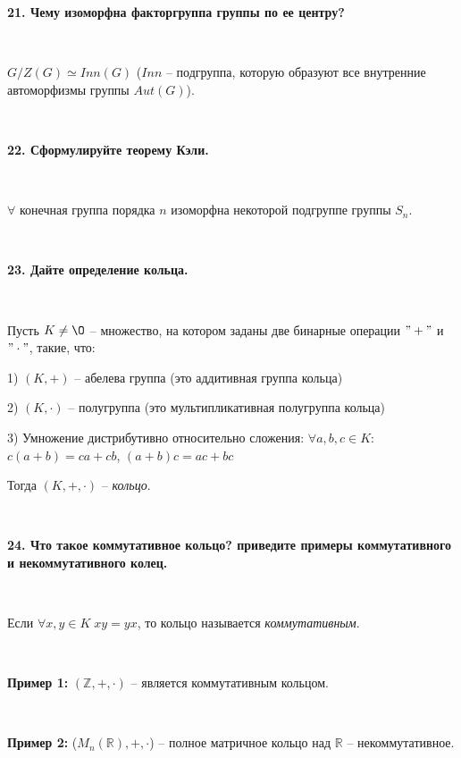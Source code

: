 \documentclass{article}
\begin{document}
	\textbf{21. Чему изоморфна факторгруппа группы по ее центру?}
	
	{
		$\;$
		\setlength{\parindent}{0.4cm}
		\hangindent=0.4cm
		
		$G/Z(G)\simeq Inn(G)$ ($Inn$ -- подгруппа, которую образуют все внутренние автоморфизмы группы $Aut(G)$).
		
		$\;$
		\setlength{\parindent}{0cm}
		\hangindent=0cm
	}
	
	\textbf{22. Сформулируйте теорему Кэли.}
	
	{
		$\;$
		\setlength{\parindent}{0.4cm}
		\hangindent=0.4cm
		
		$\forall$ конечная группа порядка $n$ изоморфна некоторой подгруппе группы $S_n$.
		
		$\;$
		\setlength{\parindent}{0cm}
		\hangindent=0cm
	}
	
	\textbf{23. Дайте определение кольца.}
	
	{
		$\;$
		\setlength{\parindent}{0.4cm}
		\hangindent=0.4cm
		
		Пусть $K\ne \O$ -- множество, на котором заданы две бинарные операции $"+"$ и $"\cdot"$, такие, что:
		
		1) $(K, +)$ -- абелева группа (это аддитивная группа кольца)
		
		2) $(K, \cdot)$ -- полугруппа (это мультипликативная полугруппа кольца)
		
		3) Умножение дистрибутивно относительно сложения: $\forall a, b, c\in K:$ $c(a+b)=ca+cb$, $(a+b)c=ac+bc$
		
		Тогда $(K, +, \cdot)$ -- \textit{кольцо}.
		
		$\;$
		\setlength{\parindent}{0cm}
		\hangindent=0cm
	}
	
	\textbf{24. Что такое коммутативное кольцо? приведите примеры коммутативного и некоммутативного колец.}
	
	{
		$\;$
		\setlength{\parindent}{0.4cm}
		\hangindent=0.4cm
		
		Если $\forall x, y\in K\;xy=yx$, то кольцо называется \textit{коммутативным}. 
		
		$\;$
		
		\textbf{Пример 1:} $(\mathbb{Z}, +, \cdot)$ -- является коммутативным кольцом.
		
		$\;$
		
		\textbf{Пример 2:} ($M_n(\mathbb{R}), +, \cdot$) -- полное матричное кольцо над $\mathbb{R}$ -- некоммутативное.
		
		$\;$
		\setlength{\parindent}{0cm}
		\hangindent=0cm
	}
	
\end{document}

